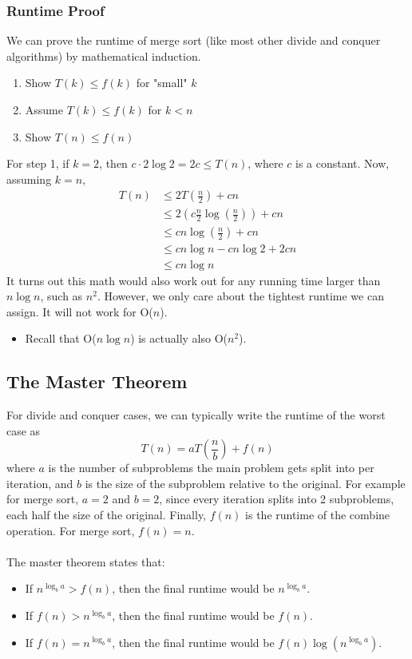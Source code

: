 \documentclass[10pt]{article}
\begin{document}
\subsubsection*{Runtime Proof}
We can prove the runtime of merge sort (like most other divide and conquer algorithms) by mathematical induction. 
\begin{enumerate}
    \item Show $T(k) \leq f(k)$ for "small" $k$
    \item Assume $T(k) \leq f(k)$ for $k < n$
    \item Show $T(n) \leq f(n)$
\end{enumerate}
For step 1, if $k = 2$, then $c \cdot 2 \log 2 = 2c \leq T(n)$, where $c$ is a constant.  Now, assuming $k = n$,
\begin{align*}
    T(n) &\leq 2 T\left(\frac{n}{2}\right) + cn\\
    &\leq 2\left(c \frac{n}{2} \log\left(\frac{n}{2}\right)\right) + cn\\
    &\leq cn \log\left(\frac{n}{2}\right) + cn\\
    &\leq cn \log n - cn \log 2 + 2cn\\
    &\leq cn \log n
\end{align*}
It turns out this math would also work out for any running time larger than $n \log n$, such as $n^2$.  However, we only care about the tightest runtime we can assign.  It will not work for O($n$).
\begin{itemize}
    \item Recall that O($n \log n$) is actually also O($n^2$).
\end{itemize}

\subsection*{The Master Theorem}
For divide and conquer cases, we can typically write the runtime of the worst case as 
\[T(n) = a T\left(\frac{n}{b}\right) + f(n)\]
where $a$ is the number of subproblems the main problem gets split into per iteration, and $b$ is the size of the subproblem relative to the original.  For example for merge sort, $a = 2$ and $b = 2$, since every iteration splits into 2 subproblems, each half the size of the original.  Finally, $f(n)$ is the runtime of the combine operation.  For merge sort, $f(n) = n$.\\\\
The master theorem states that:
\begin{itemize}
    \item If $n^{\log_b a} > f(n)$, then the final runtime would be $n^{\log_b a}$.
    \item If $f(n) > n^{\log_b a}$, then the final runtime would be $f(n)$.
    \item If $f(n) = n^{\log_b a}$, then the final runtime would be $f(n) \log (n^{\log_b a})$.
\end{itemize}
\end{document}
